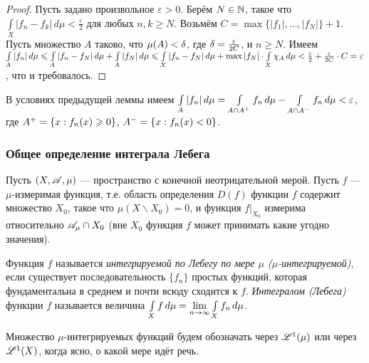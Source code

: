 \documentclass[10pt]{article}
\newcommand{\ve}{\varepsilon}
\begin{document}
\begin{proof}
Пусть задано произвольное $\ve>0$. Берём $N\in\mathbb{N}$, такое что
$\int\limits_X|f_n-f_k|\, d\mu<\frac{\ve}2$ для любых $n,k\ge N$.
Возьмём $C=\max\{|f_1|,\ldots,|f_N|\}+1$. Пусть множество $A$
таково, что $\mu(A)<\delta$, где $\de=\frac{\ve}{2C}$, и $n\ge N$.
Имеем $\int\limits_A|f_n|\,d\mu\bw
\le\int\limits_A|f_n-f_N|\,d\mu\bw +\int\limits_A|f_N|\,d\mu\bw \le
\int\limits_X|f_n-f_N|\,d\mu\bw
+\max|f_N|\cdot\int\limits_X\chi_A\,d\mu\bw
<\frac{\ve}2+\frac{\ve}{2C}\cdot C=\ve$, что и требовалось.
\end{proof}

\begin{imp}
В условиях предыдущей леммы имеем $\int\limits_A|f_n|\,d\mu\bw
=\int\limits_{A\cap A^+}f_n\,d\mu\bw -\int\limits_{A\cap
A^-}f_n\,d\mu\bw <\ve$, где $A^+\bw =\{x: f_n(x)\ge0\}$, $A^-\bw
=\{x: f_n(x)<0\}$.
\end{imp}


\subsubsection{Общее определение интеграла Лебега}

Пусть $(X,\mathscr{A},\mu)$ --- пространство с конечной неотрицательной
мерой. Пусть $f$ --- $\mu$-измеримая функция, т.е. область
определения $D(f)$ функции $f$ содержит множество $X_0$, такое что
$\mu(X\backslash X_0)=0$, и функция $\left.f\right|_{X_0}$ измерима
относительно $\mathscr{A}_\mu\cap X_0$ (вне $X_0$ функция $f$ может
принимать какие угодно значения).

\begin{df}
Функция $f$ называется \emph{интегрируемой по Лебегу по мере $\mu$
($\mu$-интегрируемой)}, если существует последовательность $\{f_n\}$
простых функций, которая фундаментальна в среднем и почти всюду
сходится к $f$. \emph{Интегралом (Лебега)} функции $f$ называется
величина $\int\limits_Xf\,d\mu\bw
=\lim\limits_{n\ra\infty}\int\limits_Xf_n\,d\mu$.
\end{df}

Множество $\mu$-интегрируемых функций будем обозначать через
$\mathscr{L}^1(\mu)$ или через $\mathscr{L}^1(X)$, когда ясно, о какой мере идёт
речь.
\end{document}
